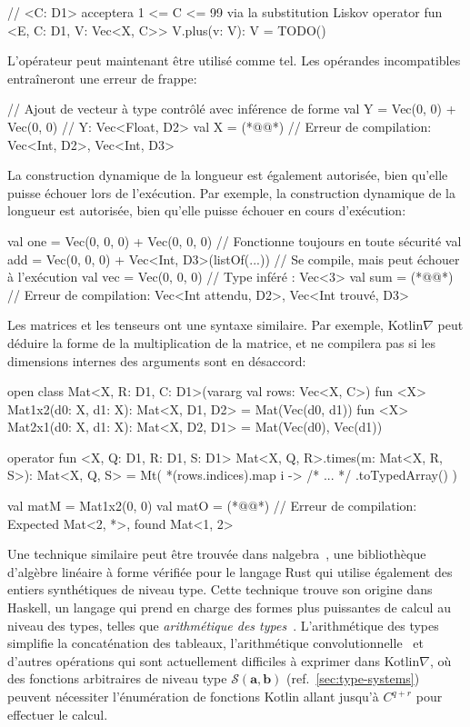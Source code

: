 %
\begin{kotlinlisting}
// <C: D1> acceptera 1 <= C <= 99 via la substitution Liskov
operator fun <E, C: D1, V: Vec<X, C>> V.plus(v: V): V = TODO()
\end{kotlinlisting}
%
L'opérateur \inline{+} peut maintenant être utilisé comme tel. Les opérandes incompatibles entraîneront une erreur de frappe:
%
\begin{kotlinlisting}
// Ajout de vecteur à type contrôlé avec inférence de forme
val Y = Vec(0, 0) + Vec(0, 0) // Y: Vec<Float, D2>
val X = (*@@*) // Erreur de compilation: Vec<Int, D2>, Vec<Int, D3>
\end{kotlinlisting}
%
La construction dynamique de la longueur est également autorisée, bien qu'elle puisse échouer lors de l'exécution. Par exemple, la construction dynamique de la longueur est autorisée, bien qu'elle puisse échouer en cours d'exécution:
%
\begin{kotlinlisting}
val one = Vec(0, 0, 0) + Vec(0, 0, 0) // Fonctionne toujours en toute sécurité
val add = Vec(0, 0, 0) + Vec<Int, D3>(listOf(...)) // Se compile, mais peut échouer à l'exécution
val vec = Vec(0, 0, 0) // Type inféré : Vec<3>
val sum = (*@@*) // Erreur de compilation: Vec<Int attendu, D2>, Vec<Int trouvé, D3>
\end{kotlinlisting}
%
Les matrices et les tenseurs ont une syntaxe similaire. Par exemple, Kotlin$\nabla$ peut déduire la forme de la multiplication de la matrice, et ne compilera pas si les dimensions internes des arguments sont en désaccord:
%
\begin{kotlinlisting}
open class Mat<X, R: D1, C: D1>(vararg val rows: Vec<X, C>)
fun <X> Mat1x2(d0: X, d1: X): Mat<X, D1, D2> = Mat(Vec(d0, d1))
fun <X> Mat2x1(d0: X, d1: X): Mat<X, D2, D1> = Mat(Vec(d0), Vec(d1))

operator fun <X, Q: D1, R: D1, S: D1> Mat<X, Q, R>.times(m: Mat<X, R, S>): Mat<X, Q, S> =
    Mt( *(rows.indices).map { i -> /* ... */ }.toTypedArray() )

val matM = Mat1x2(0, 0)
val matO = (*@@*) // Erreur de compilation: Expected Mat<2, *>, found Mat<1, 2>
\end{kotlinlisting}
%
Une technique similaire peut être trouvée dans nalgebra~\citep{crozet2019nalgebra}, une bibliothèque d'algèbre linéaire à forme vérifiée pour le langage Rust qui utilise également des entiers synthétiques de niveau type. Cette technique trouve son origine dans Haskell, un langage qui prend en charge des formes plus puissantes de calcul au niveau des types, telles que \textit{arithmétique des types}~\citep{kiselyov2005number}. L'arithmétique des types simplifie la concaténation des tableaux, l'arithmétique convolutionnelle~\citep{dumoulin2016guide} et d'autres opérations qui sont actuellement difficiles à exprimer dans Kotlin$\nabla$, où des fonctions arbitraires de niveau type $\mathcal{S}(\mathbf a, \mathbf b)$ (ref.~\autoref{sec:type-systems}) peuvent nécessiter l'énumération de fonctions Kotlin allant jusqu'à $C^{q + r}$ pour effectuer le calcul.

